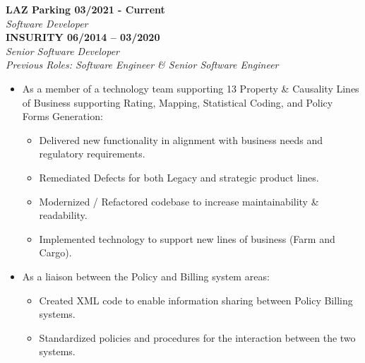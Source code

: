 


\begin{cvparagraph}

   {\normalsize \textbf{LAZ Parking \hfill 03/2021 - Current}} \\
   {\sl Software Developer} \\


   {\normalsize \textbf{ INSURITY \hfill 06/2014 -- 03/2020}} \\
   {\sl Senior Software Developer} \\
   {\sl Previous Roles: Software Engineer \& Senior Software Engineer} \\

   \begin{itemize}
      \item As a member of a technology team supporting 13 Property \& Causality
         Lines of Business supporting Rating, Mapping, Statistical Coding, and Policy 
         Forms Generation:
         \begin{itemize}
            \item Delivered new functionality in alignment with business needs and 
               regulatory requirements.
            \item Remediated Defects for both Legacy and strategic product lines. 
            \item Modernized / Refactored codebase to increase maintainability \& 
               readability.
            \item Implemented technology to support new lines of business (Farm and Cargo).
         \end{itemize}

      \item As a liaison between the Policy and Billing system areas:
         \begin{itemize}
            \item Created XML code to enable information sharing between Policy Billing 
               systems.
            \item Standardized policies and procedures for the interaction between the 
               two systems.
         \end{itemize}


\end{itemize}
\end{cvparagraph}
